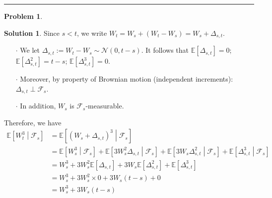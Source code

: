 \documentclass[a4paper, 10pt]{article}
\theoremstyle{definition}
\newtheorem{problem}{Problem}
\theoremstyle{hSol}
\newtheorem*{solution}{Solution}
\begin{document}
\noindent\rule{16cm}{0.4pt}
\begin{problem}
\end{problem}
\begin{solution} Since $s<t$, we write $W_t = W_s + (W_t - W_s) = W_s + \Delta_{s,t}$. 
\begin{itemize}
	\item[$\cdot$] We let $\Delta_{s,t} := W_t - W_s \sim \mathcal{N}(0, t-s)$. It follows that $\mathbb{E}\left[\Delta_{s,t}\right]=0$; $\mathbb{E}\left[\Delta_{s,t}^2\right] = t-s$; $\mathbb{E}\left[\Delta_{s,t}^3\right]=0$.
	\item[$\cdot$] Moreover, by property of Brownian motion (independent increments): $\Delta_{s,t} \perp \mathcal{F}_s$.
	\item[$\cdot$] In addition, $W_s$ is $\mathcal{F}_s$-measurable.
\end{itemize}
Therefore, we have
\begin{equation}
	\begin{split}
		\mathbb{E}\left[W_t^3\middle|\mathcal{F}_s\right] &= \mathbb{E}\left[(W_s + \Delta_{s,t})^3\middle|\mathcal{F}_s\right] \\
		&= \mathbb{E}\left[W_s^3\middle|\mathcal{F}_s\right] +\mathbb{E}\left[3W_s^2\Delta_{s,t}\middle|\mathcal{F}_s\right]+ \mathbb{E}\left[3W_s\Delta_{s,t}^2\middle|\mathcal{F}_s\right]+ \mathbb{E}\left[\Delta_{s,t}^3\middle|\mathcal{F}_s\right] \\
		&= W_s^3 + 3W_s^2 \mathbb{E}\left[\Delta_{s,t}\right] + 3W_s \mathbb{E}\left[\Delta_{s,t}^2\right] + \mathbb{E}\left[\Delta_{s,t}^3\right] \\
		&= W_s^3 + 3W_s^2\times 0 + 3W_s(t-s) + 0\\
		&= W_s^3  + 3W_s(t-s)
	\end{split}
\end{equation}
\end{solution}
\end{document}
